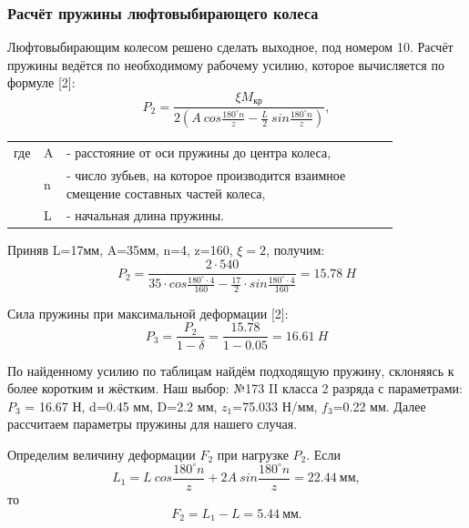 \documentclass[14pt,a4paper,russian]{scrartcl}
\begin{document}
    \subsubsection{Расчёт пружины люфтовыбирающего колеса}
        Люфтовыбирающим колесом решено сделать выходное, под номером 10.
        Расчёт пружины ведётся по необходимому рабочему усилию, которое
        вычисляется по формуле [2]:
        \[ P_2 = \frac{\xi M_{\text{кр}}}{2(A\ cos\frac{180^\circ n}{z}
                - \frac{L}{2}\ sin\frac{180^\circ n}{z})},\]
        \begin{table}[h!]
            \begin{center}
                \begin{tabular}{p{0.025\linewidth}p{0.01\linewidth}p{0.8\linewidth}}
                    где & A & - расстояние от оси пружины до центра колеса,\\
                    & n & - число зубьев, на которое производится взаимное смещение составных частей колеса,\\
                    & L & - начальная длина пружины.
                \end{tabular}
            \end{center}
        \end{table}

        Приняв L=17мм, A=35мм, n=4, 
        z=160, \( \xi=2 \), получим:
        \[ P_2 = \frac{2\cdot540}{35\cdot cos\frac{180^\circ\cdot4}{160}
                - \frac{17}{2}\cdot sin\frac{180^\circ\cdot4}{160}} = 15.78\ H\]
        
        Сила пружины при максимальной деформации [2]:
        \[ P_3 = \frac{P_2}{1-\delta} = \frac{15.78}{1-0.05} = 16.61\ H\]

        По найденному усилию по таблицам найдём подходящую пружину, склоняясь к более коротким
        и жёстким. Наш выбор: №173 II класса 2 разряда с параметрами: \( P_3 \) = 16.67 Н, d=0.45 мм, 
        D=2.2 мм, \( z_1 \)=75.033 Н/мм, \( f_3 \)=0.22 мм. Далее рассчитаем параметры
        пружины для нашего случая.

        Определим величину деформации \( F_2 \) при нагрузке \( P_2 \). Если 
        \[ L_1 =  L\ cos\frac{180^\circ n}{z} + 2A\ sin\frac{180^\circ n}{z} = 22.44\ \text{мм},\]
        то 
        \[ F_2 = L_1 - L = 5.44\ \text{мм}.\]
\end{document}
